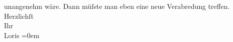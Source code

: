 \begin{ledgroupsized}[t]{13cm}
                    unangenehm wäre. Dann müſste man eben eine neue Verabredung treffen.\pend
           \pstart
           Herzlichſt{\\[\baselineskip]}Ihr{\\[\baselineskip]}\spacefill\mbox{Loris}\pend
           \leftskip=0em{}          \endnumbering{}\end{ledgroupsized}  \newcommand{\dateiname}{L00093}\newcommand{\titel}{Hugo von Hofmannsthal an Arthur Schnitzler, 10. 4. 1892}\newcommand{\editorInnen}{Martin Anton Müller und Gerd-Hermann Susen}
      